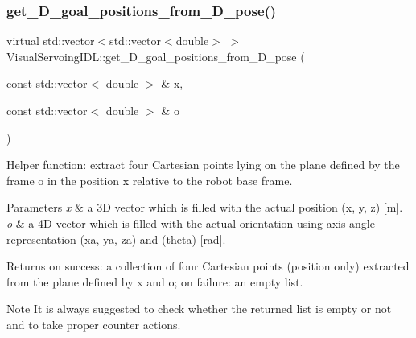 \mbox{\label{classVisualServoingIDL_a175b2d3fb77000e0012c7a8d16e9a379}} 
\subsubsection{\texorpdfstring{get\+\_\+D\+\_\+goal\+\_\+positions\+\_\+from\+\_\+D\+\_\+pose()}{get\_3D\_goal\_positions\_from\_3D\_pose()}}
{\footnotesize\ttfamily virtual std\+::vector$<$std\+::vector$<$double$>$ $>$ Visual\+Servoing\+I\+D\+L\+::get\+\_\+D\+\_\+goal\+\_\+positions\+\_\+from\+\_\+D\+\_\+pose (\begin{DoxyParamCaption}\item[{const std\+::vector$<$ double $>$ \&}]{x,  }\item[{const std\+::vector$<$ double $>$ \&}]{o }\end{DoxyParamCaption})\hspace{0.3cm}{\ttfamily [virtual]}}



Helper function\+: extract four Cartesian points lying on the plane defined by the frame o in the position x relative to the robot base frame. 


\begin{DoxyParams}{Parameters}
{\em x} & a 3D vector which is filled with the actual position (x, y, z) \mbox{[}m\mbox{]}. \\
\hline
{\em o} & a 4D vector which is filled with the actual orientation using axis-\/angle representation (xa, ya, za) and (theta) \mbox{[}rad\mbox{]}. \\
\hline
\end{DoxyParams}
\begin{DoxyReturn}{Returns}
on success\+: a collection of four Cartesian points (position only) extracted from the plane defined by x and o; on failure\+: an empty list. 
\end{DoxyReturn}
\begin{DoxyNote}{Note}
It is always suggested to check whether the returned list is empty or not and to take proper counter actions. 
\end{DoxyNote}


